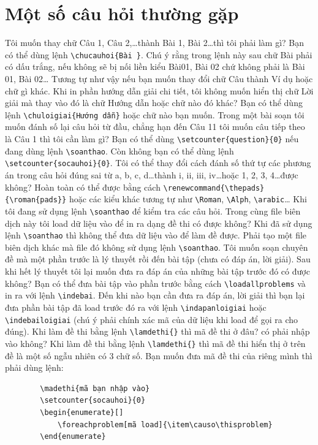 	\chapter{Một số câu hỏi thường gặp}
	\hoi Tôi muốn thay chữ Câu 1, Câu 2,\ldots thành Bài 1, Bài 2\ldots thì tôi phải làm gì?
	\dap Bạn có thể dùng lệnh \verb'\chucauhoi{Bài }'. Chú ý rằng trong lệnh này sau chữ Bài phải có dấu trắng, nếu không sẽ bị nối liền kiểu Bài01, Bài 02 chứ không phải là Bài 01, Bài 02\ldots
	Tương tự như vậy nếu bạn muốn thay đổi chữ Câu thành Ví dụ hoặc chữ gì khác.
	\hoi Khi in phần hướng dẫn giải chi tiết, tôi không muốn hiển thị chữ Lời giải mà thay vào đó là chữ Hướng dẫn hoặc chữ nào đó khác?
	\dap Bạn có thể dùng lệnh \verb'\chuloigiai{Hướng dẫn}' hoặc chữ nào bạn muốn.
	\hoi Trong một bài soạn tôi muốn đánh số lại câu hỏi từ đầu, chẳng hạn đến Câu 11 tôi muốn câu tiếp theo là Câu 1 thì tôi cần làm gì?
	\dap Bạn có thể dùng \verb'\setcounter{question}{0}' nếu đang dùng lệnh \verb'\soanthao'. Còn không bạn có thể dùng lệnh \verb'\setcounter{socauhoi}{0}'.
	\hoi Tôi có thể thay đổi cách đánh số thứ tự các phương án trong câu hỏi đúng sai từ a, b, c, d\ldots thành i, ii, iii, iv\ldots hoặc 1, 2, 3, 4\ldots được không?
	\dap Hoàn toàn có thể được bằng cách \verb'\renewcommand{\thepads}{\roman{pads}}' hoặc các kiểu khác tương tự như \verb'\Roman', \verb'\Alph', \verb'\arabic'\ldots
	\hoi Khi tôi đang sử dụng lệnh \verb'\soanthao' để kiểm tra các câu hỏi. Trong cùng file biên dịch này tôi load dữ liệu vào để in ra dạng đề thi có được không?
	\dap Khi đã sử dụng lệnh \verb'\soanthao' thì không thể đưa dữ liệu vào để làm đề được. Phải tạo một file biên dịch khác mà file đó không sử dụng lệnh \verb'\soanthao'.
	\hoi Tôi muốn soạn chuyên đề mà một phần trước là lý thuyết rồi đến bài tập (chưa có đáp án, lời giải). Sau khi hết lý thuyết tôi lại muốn đưa ra đáp án của những bài tập trước đó có được không?
	\dap Bạn có thể đưa bài tập vào phần trước bằng cách \verb'\loadallproblems' và in ra với lệnh \verb'\indebai'. Đến khi nào bạn cần đưa ra đáp án, lời giải thì bạn lại đưa phần bài tập đã load trước đó ra với lệnh \verb'\indapanloigiai' hoặc \verb'\indebailoigiai' (chú ý phải chính xác mã của dữ liệu khi load để gọi ra cho đúng).
	\hoi Khi làm đề thi bằng lệnh \verb'\lamdethi{}' thì mã đề thi ở đâu? có phải nhập vào không?
	\dap Khi làm đề thi bằng lệnh \verb'\lamdethi{}' thì mã đề thi hiển thị ở trên đề là một số ngẫu nhiên có 3 chữ số. Bạn muốn đưa mã đề thi của riêng mình thì phải dùng lệnh:
	\begin{verbatim}
		\madethi{mã bạn nhập vào}
		\setcounter{socauhoi}{0}
		\begin{enumerate}[]
			\foreachproblem[mã load]{\item\causo\thisproblem}
		\end{enumerate}
	\end{verbatim}
